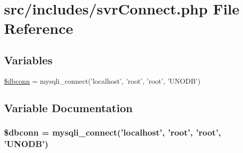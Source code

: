 \hypertarget{includes_2svrConnect_8php}{\section{src/includes/svr\-Connect.php \-File \-Reference}
\label{includes_2svrConnect_8php}
}
\subsection*{\-Variables}
\begin{DoxyCompactItemize}
\item 
\hyperlink{includes_2svrConnect_8php_aefbfdbdc7b698d2c2220f869fc668040}{\$dbconn} = mysqli\-\_\-connect('localhost', 'root', 'root', '\-U\-N\-O\-D\-B')
\end{DoxyCompactItemize}


\subsection{\-Variable \-Documentation}
\hypertarget{includes_2svrConnect_8php_aefbfdbdc7b698d2c2220f869fc668040}{
\subsubsection[{\$dbconn}]{\setlength{\rightskip}{0pt plus 5cm}\$dbconn = mysqli\-\_\-connect('localhost', 'root', 'root', '\-U\-N\-O\-D\-B')}}\label{includes_2svrConnect_8php_aefbfdbdc7b698d2c2220f869fc668040}
